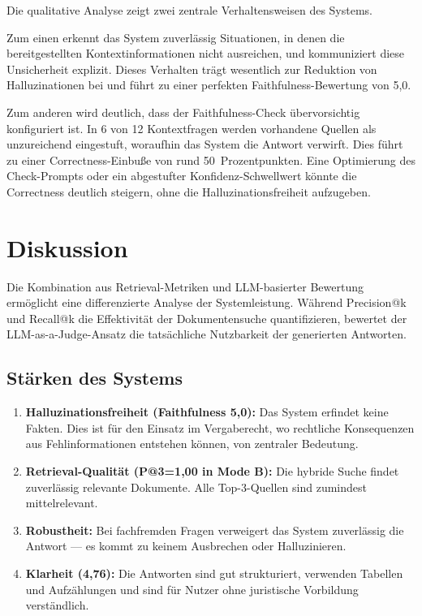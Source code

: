 \documentclass[12pt,a4paper]{scrreprt}
\begin{document}
Die qualitative Analyse zeigt zwei zentrale Verhaltensweisen des Systems.

Zum einen erkennt das System zuverlässig Situationen, in denen die bereitgestellten Kontextinformationen nicht ausreichen, und kommuniziert diese Unsicherheit explizit. Dieses Verhalten trägt wesentlich zur Reduktion von Halluzinationen bei und führt zu einer perfekten Faithfulness-Bewertung von 5,0.

Zum anderen wird deutlich, dass der Faithfulness-Check übervorsichtig konfiguriert ist. In 6 von 12 Kontextfragen werden vorhandene Quellen als unzureichend eingestuft, woraufhin das System die Antwort verwirft. Dies führt zu einer Correctness-Einbuße von rund 50~Prozentpunkten. Eine Optimierung des Check-Prompts oder ein abgestufter Konfidenz-Schwellwert könnte die Correctness deutlich steigern, ohne die Halluzinationsfreiheit aufzugeben.

\section{Diskussion}
\label{sec:diskussion}

Die Kombination aus Retrieval-Metriken und LLM-basierter Bewertung ermöglicht eine differenzierte Analyse der Systemleistung. Während Precision@k und Recall@k die Effektivität der Dokumentensuche quantifizieren, bewertet der LLM-as-a-Judge-Ansatz die tatsächliche Nutzbarkeit der generierten Antworten.

\subsection{Stärken des Systems}

\begin{enumerate}
  \item \textbf{Halluzinationsfreiheit (Faithfulness 5,0):} Das System erfindet keine Fakten. Dies ist für den Einsatz im Vergaberecht, wo rechtliche Konsequenzen aus Fehlinformationen entstehen können, von zentraler Bedeutung.
  \item \textbf{Retrieval-Qualität (P@3=1,00 in Mode B):} Die hybride Suche findet zuverlässig relevante Dokumente. Alle Top-3-Quellen sind zumindest mittelrelevant.
  \item \textbf{Robustheit:} Bei fachfremden Fragen verweigert das System zuverlässig die Antwort --- es kommt zu keinem \glqq Ausbrechen\grqq{} oder Halluzinieren.
  \item \textbf{Klarheit (4,76):} Die Antworten sind gut strukturiert, verwenden Tabellen und Aufzählungen und sind für Nutzer ohne juristische Vorbildung verständlich.
\end{enumerate}
\end{document}
